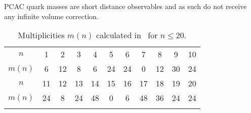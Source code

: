 PCAC quark masses are short distance observables and as such do not receive any infinite volume correction.

\vspace{2cm}

\begin{longtable}{c c c c c c c c c c c}
\toprule
$n$ & 1 & 2 & 3 & 4 & 5 & 6 & 7 & 8 & 9 & 10 \\
$m(n)$ & 6 & 12 & 8 & 6 & 24 & 24 & 0 & 12 & 30 & 24 \\
\midrule
$n$ & 11 & 12 & 13 & 14 & 15 & 16 & 17 & 18 & 19 & 20 \\
$m(n)$ & 24 & 8 & 24 & 48 & 0 & 6 & 48 & 36 & 24 & 24 \\
\bottomrule
\caption{Multiplicities $m(n)$ calculated in~\citep{Colangelo:2003hf} for $n\leq20$.}
\label{apex_fv:tab:mn}
\end{longtable}


